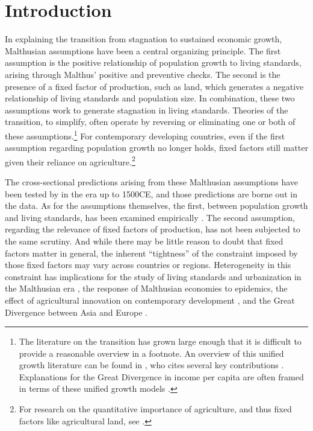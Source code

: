 \documentclass[11pt]{article}
\begin{document}
\pagebreak 

\section{Introduction}
\onehalfspacing 
In explaining the transition from stagnation to sustained economic growth, Malthusian assumptions have been a central organizing principle. The first assumption is the positive relationship of population growth to living standards, arising through Malthus' positive and preventive checks. The second is the presence of a fixed factor of production, such as land, which generates a negative relationship of living standards and population size. In combination, these two assumptions work to generate stagnation in living standards. Theories of the transition, to simplify, often operate by reversing or eliminating one or both of these assumptions.\footnote{The literature on the transition has grown large enough that it is difficult to provide a reasonable overview in a footnote. An overview of this unified growth literature can be found in \citet{Galor:2011uq}, who cites several key contributions \citep{gw00,galor2002natural,Hansen:2002fk,doepke2004accounting,cs2005,lagerlof2006,craftsmills2009,strulik2008population}. Explanations for the Great Divergence in income per capita are often framed in terms of these unified growth models \citep{kp2001,galor2008trading,vv08,vv13,cs2015}.} For contemporary developing countries, even if the first assumption regarding population growth no longer holds, fixed factors still matter given their reliance on agriculture.\footnote{For research on the quantitative importance of agriculture, and thus fixed factors like agricultural land, see \citet{Gollin:2007oq,Restuccia:2008hc,weilwilde2009,Alvarez-Cuadrado:2011nx,Gollin:2010ys}.}  

The cross-sectional predictions arising from these Malthusian assumptions have been tested by \citet{ashraf2010dynamics} in the era up to 1500CE, and those predictions are borne out in the data. As for the assumptions themselves, the first, between population growth and living standards, has been examined empirically \citep{LeeAnderson2002,craftsmills2009,kellyograda2012,kellyograda2014,lagerlof2015}. The second assumption, regarding the relevance of fixed factors of production, has not been subjected to the same scrutiny. And while there may be little reason to doubt that fixed factors matter in general, the inherent ``tightness'' of the constraint imposed by those fixed factors may vary across countries or regions. Heterogeneity in this constraint has implications for the study of living standards and urbanization in the Malthusian era \citep{vollrath2011}, the response of Malthusian economies to epidemics, the effect of agricultural innovation on contemporary development \citep{ev2016clim,ev2016}, and the Great Divergence between Asia and Europe \citep{pom2000}.
\end{document}
